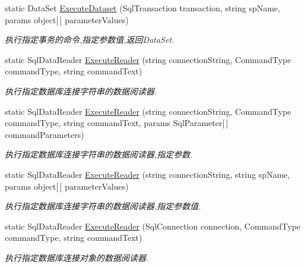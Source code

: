 \begin{DoxyCompactItemize}
static Data\+Set \hyperlink{class_x_c_l_net_tools_1_1_data_base_1_1_m_s_s_q_l_1_1_sql_helper_ab9f4eb58c69b8db635b5a53547e068fe}{Execute\+Dataset} (Sql\+Transaction transaction, string sp\+Name, params object\mbox{[}$\,$\mbox{]} parameter\+Values)
\begin{DoxyCompactList}\small\item\em 执行指定事务的命令,指定参数值,返回\+Data\+Set. \end{DoxyCompactList}\item 
static Sql\+Data\+Reader \hyperlink{class_x_c_l_net_tools_1_1_data_base_1_1_m_s_s_q_l_1_1_sql_helper_a70c403cd069bcfe3efeab17306c76a91}{Execute\+Reader} (string connection\+String, Command\+Type command\+Type, string command\+Text)
\begin{DoxyCompactList}\small\item\em 执行指定数据库连接字符串的数据阅读器. \end{DoxyCompactList}\item 
static Sql\+Data\+Reader \hyperlink{class_x_c_l_net_tools_1_1_data_base_1_1_m_s_s_q_l_1_1_sql_helper_ae47cd18e9ab625b40309a1efee21c205}{Execute\+Reader} (string connection\+String, Command\+Type command\+Type, string command\+Text, params Sql\+Parameter\mbox{[}$\,$\mbox{]} command\+Parameters)
\begin{DoxyCompactList}\small\item\em 执行指定数据库连接字符串的数据阅读器,指定参数. \end{DoxyCompactList}\item 
static Sql\+Data\+Reader \hyperlink{class_x_c_l_net_tools_1_1_data_base_1_1_m_s_s_q_l_1_1_sql_helper_a9d7dd29995996f31a09cf5e02f8e138c}{Execute\+Reader} (string connection\+String, string sp\+Name, params object\mbox{[}$\,$\mbox{]} parameter\+Values)
\begin{DoxyCompactList}\small\item\em 执行指定数据库连接字符串的数据阅读器,指定参数值. \end{DoxyCompactList}\item 
static Sql\+Data\+Reader \hyperlink{class_x_c_l_net_tools_1_1_data_base_1_1_m_s_s_q_l_1_1_sql_helper_adb1afcb435b963bf4848bc42cda3a458}{Execute\+Reader} (Sql\+Connection connection, Command\+Type command\+Type, string command\+Text)
\begin{DoxyCompactList}\small\item\em 执行指定数据库连接对象的数据阅读器. \end{DoxyCompactList}\item 

\end{DoxyCompactItemize}
